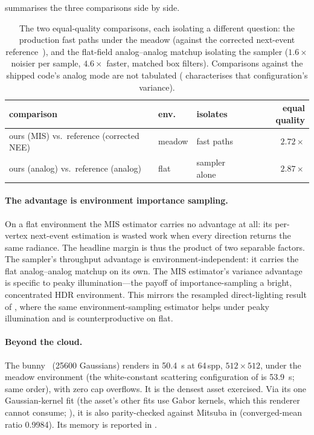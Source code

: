  summarises the three comparisons side by side.

\begin{table}[htp]
  \centering
  \small
  \begin{tabular}{@{}lllr@{}}
    \toprule
    comparison & env.\ & isolates & equal quality \\
    \midrule
    ours (MIS) vs.\ reference (corrected NEE) & meadow & fast paths & $\mathbf{2.72\times}$ \\
    ours (analog) vs.\ reference (analog) & flat & sampler alone & $\mathbf{2.87\times}$ \\
    \bottomrule
  \end{tabular}
  \caption{The two equal-quality comparisons, each isolating a different question: the production
fast paths under the meadow (against the corrected next-event
reference~\cite{KramarzVolprimFixes2026}), and the flat-field analog--analog matchup
isolating the sampler ($1.6\times$ noisier per sample, $4.6\times$ faster, matched box
filters). Comparisons against the shipped code's analog mode are not tabulated
( characterises that configuration's variance).}
  \label{tab:likeforlike}
\end{table}

\paragraph{The advantage is environment importance sampling.} On a flat environment the MIS
estimator carries no advantage at
all: its per-vertex next-event estimation is wasted work when every direction returns the same
radiance. The headline margin is thus the
product of
two separable factors. The sampler's throughput advantage is environment-independent: it
carries the flat analog--analog matchup on its own. The MIS estimator's variance advantage
is specific to peaky illumination---the payoff of importance-sampling a bright, concentrated
HDR environment. This mirrors the resampled direct-lighting result of , where the same
environment-sampling estimator helps under peaky illumination and is counterproductive on
flat.

\paragraph{Beyond the cloud.} The bunny~\cite{TurkLevoy1994} (\num{25600} Gaussians) renders in \SI{50.4}{\second} at
\num{64}\,spp, \(512\times512\), under the meadow environment (the white-constant scattering configuration of
 is \SI{53.9}{\second}; same order), with zero cap overflows. It is the densest
asset exercised. Via its one Gaussian-kernel fit (the asset's other fits use Gabor kernels, which this
renderer cannot consume; ), it is also parity-checked against Mitsuba in  (converged-mean
ratio \num{0.9984}). Its memory is reported in .

